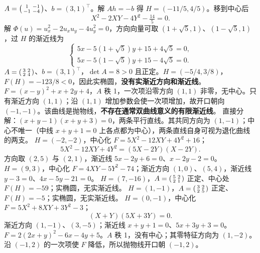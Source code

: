 $A=\begin{psmallmatrix}1&-1\\-1&-4\end{psmallmatrix}$、$b=(3,1)^\top$。解 $Ah=-b$ 得 $H=(-11/5,4/5)$。移到中心后
\[X^2-2XY-4Y^2-\tfrac{14}{5}=0.\]
解 $\Phi(u)=u_x^2-2u_xu_y-4u_y^2=0$，方向向量可取 $(1+\sqrt5,1)$、$(1-\sqrt5,1)$，过 $H$ 的渐近线为
\[
\begin{cases}5x-5(1+\sqrt5)y+15+4\sqrt5=0,\\5x-5(1-\sqrt5)y+15-4\sqrt5=0.\end{cases}
\]
$A=\begin{psmallmatrix}3&2\\2&4\end{psmallmatrix}$、$b=(3,1)^\top$，$\det A=8>0$ 且正定。$H=(-5/4,3/8)$，$F(H)=-123/8<0$，因此实椭圆，\textbf{没有实渐近方向和渐近线}。
$F=(x-y)^2+x+2y+4$，$A$ 秩 1，一次项沿零方向 $(1,1)$ 非零，无中心。只有渐近方向 $(1,1)$；沿 $(1,1)$ 增加参数会使一次项增加，故开口朝向 $(-1,-1)$。该曲线是抛物线，\textbf{不存在通常双曲线意义的有限渐近线}。
直接分解：$(x+y-1)(x+y+3)=0$，两条平行直线。其共同方向为 $(1,-1)$；中心不唯一（中线 $x+y+1=0$ 上各点都为中心），两条直线自身可视为退化曲线的两支。
$H=(-2,-2)$，中心化 $F=5X^2-12XY+4Y^2+16$；
\[5X^2-12XY+4Y^2=(5X-2Y)(X-2Y).
\]
方向取 $(2,5)$ 与 $(2,1)$，渐近线 $5x-2y+6=0$、$x-2y-2=0$。
$H=(9,3)$，中心化 $F=4XY-5Y^2-74$；渐近方向 $(1,0)$、$(5,4)$，渐近线 $y-3=0$、$4x-5y-21=0$。
$H=(7,-16)$，$A=\begin{psmallmatrix}5&2\\2&1\end{psmallmatrix}$ 正定、中心处 $F(H)=-59$；实椭圆，无实渐近线。
$H=(1,-1)$，$A=\begin{psmallmatrix}3&2\\2&5\end{psmallmatrix}$ 正定、$F(H)=-5$；实椭圆，无实渐近线。
$H=(0,-1)$，中心化 $F=5X^2+8XY+3Y^2-3$；
\[(X+Y)(5X+3Y)=0.
\]
渐近方向 $(1,-1)$、$(3,-5)$；渐近线 $x+y+1=0$、$5x+3y+3=0$。
$F=2(2x+y)^2-6x-4y+5$。$A$ 秩 1，没有中心；其零特征方向为 $(1,-2)$。沿 $(-1,2)$ 的一次项使 $F$ 降低，所以抛物线开口朝 $(-1,2)$。

